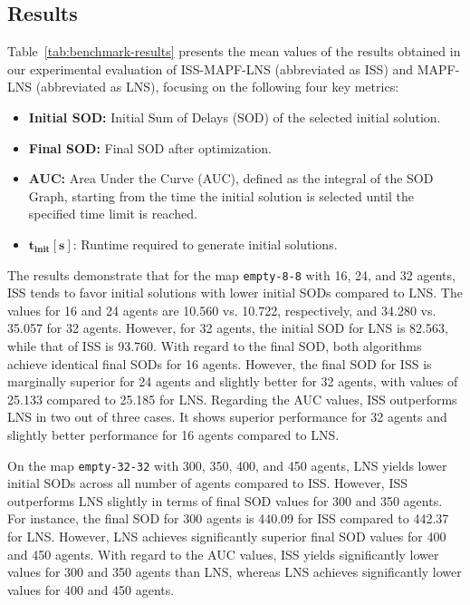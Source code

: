 \documentclass[runningheads]{llncs}
\begin{document}
\subsection{Results}

Table~\ref{tab:benchmark-results} presents the mean values of the results obtained in our experimental evaluation of ISS-MAPF-LNS (abbreviated as ISS) and MAPF-LNS (abbreviated as LNS), focusing on the following four key metrics:

\begin{itemize}
    \item \textbf{Initial SOD:} Initial Sum of Delays (SOD) of the selected initial solution.
    \item \textbf{Final SOD:} Final SOD after optimization.
    \item \textbf{AUC:} Area Under the Curve (AUC), defined as the integral of the SOD Graph, starting from the time the initial solution is selected until the specified time limit is reached.
    \item $\boldsymbol{t}_\mathbf{init}[\boldsymbol{s}]$: Runtime required to generate initial solutions.
\end{itemize} 


The results demonstrate that for the map \texttt{empty-8-8} with 16, 24, and 32 agents, ISS tends to favor initial solutions with lower initial SODs compared to LNS. The values for 16 and 24 agents are 10.560 vs. 10.722, respectively, and 34.280 vs. 35.057 for 32 agents. However, for 32 agents, the initial SOD for LNS is 82.563, while that of ISS is 93.760. With regard to the final SOD, both algorithms achieve identical final SODs for 16 agents. However, the final SOD for ISS is marginally superior for 24 agents and slightly better for 32 agents, with values of 25.133 compared to 25.185 for LNS. Regarding the AUC values, ISS outperforms LNS in two out of three cases. It shows superior performance for 32 agents and slightly better performance for 16 agents compared to LNS.

On the map \texttt{empty-32-32} with 300, 350, 400, and 450 agents, LNS yields lower initial SODs across all number of agents compared to ISS. However, ISS outperforms LNS slightly in terms of final SOD values for 300 and 350 agents. For instance, the final SOD for 300 agents is 440.09 for ISS compared to 442.37 for LNS. However, LNS achieves significantly superior final SOD values for 400 and 450 agents. With regard to the AUC values, ISS yields significantly lower values for 300 and 350 agents than LNS, whereas LNS achieves significantly lower values for 400 and 450 agents.
\end{document}
